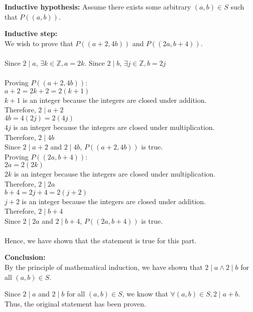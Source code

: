 \documentclass[leqno]{article}
\numberwithin{equation}{section}
\theoremstyle{definition}
\begin{document}
\bigskip

\textbf{Inductive hypothesis:} Assume there exists some arbitrary $(a, b) \in S$ such that $P((a, b))$.

\bigskip

\textbf{Inductive step:}\\
We wish to prove that $P((a + 2, 4b))$ and $P((2a, b + 4))$.\\
\,\\
Since $2 \mid a$, $\exists k \in \mathbb{Z}, a = 2k$. Since $2 \mid b$, $\exists j \in \mathbb{Z}, b = 2j$\\
\,\\
Proving $P((a + 2, 4b))$:\\
$a + 2 = 2k + 2 = 2(k+1)$\\
$k+1$ is an integer because the integers are closed under addition.\\
Therefore, $2 \mid a + 2$\\
$4b = 4(2j) = 2(4j)$\\
$4j$ is an integer because the integers are closed under multiplication.\\
Therefore, $2 \mid 4b$\\
Since $2 \mid a+2$ and $2 \mid 4b$, $P((a+2, 4b))$ is true.
\,\\
Proving $P((2a, b + 4))$:\\
$2a = 2(2k)$\\
$2k$ is an integer because the integers are closed under multiplication.\\
Therefore, $2 \mid 2a$\\
$b + 4 = 2j + 4 = 2(j+2)$\\
$j+2$ is an integer because the integers are closed under addition.\\
Therefore, $2 \mid b+4$\\
Since $2 \mid 2a$ and $2 \mid b+4$, $P((2a, b+4))$ is true.\\
\,\\
Hence, we have shown that the statement is true for this part.

\bigskip

\textbf{Conclusion:}\\
By the principle of mathematical induction, we have shown that $2 \mid a \land 2 \mid b$ for all $(a, b) \in S$.

\bigskip

Since $2 \mid a$ and $2 \mid b$ for all $(a, b) \in S$, we know that $\forall (a, b) \in S, 2 \mid a + b$. Thus, the original statement has been proven.
\end{document}
